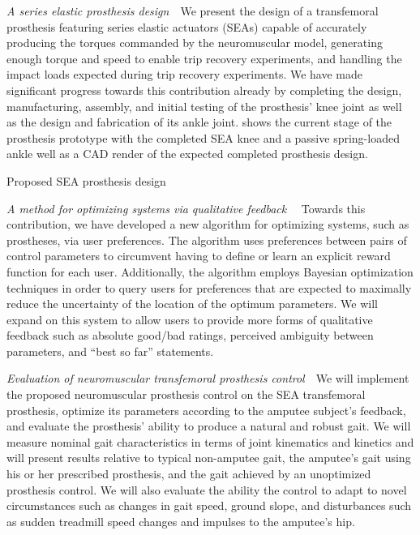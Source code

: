 \begin{contributions}
    \item\label{contrib:pros_design} \emph{A series elastic prosthesis
    design}~~We present the design of a transfemoral prosthesis featuring series
    elastic actuators (SEAs) capable of accurately producing the torques
    commanded by the neuromuscular model, generating enough torque and speed to
    enable trip recovery experiments, and handling the impact loads expected
    during trip recovery experiments. We have made significant progress towards
    this contribution already by completing the design, manufacturing, assembly,
    and initial testing of the prosthesis' knee joint as well as the design and
    fabrication of its ankle joint.   shows the
    current stage of the prosthesis prototype with the completed SEA knee and a
    passive spring-loaded ankle well as a CAD render of the expected completed
    prosthesis design.
    \begin{marginfigure}[-2in]
        \centering
        \caption{Proposed SEA prosthesis design}
        \label{fig:prosthesis_design}
    \end{marginfigure}

    \item\label{contrib:pref_opt} \emph{A method for optimizing systems via
    qualitative feedback}~~ Towards this contribution, we have developed a new
    algorithm for optimizing systems, such as prostheses, via user preferences.
    The algorithm uses preferences between pairs of control parameters to
    circumvent having to define or learn an explicit reward function for each
    user. Additionally, the algorithm employs Bayesian optimization techniques
    in order to query users for preferences that are expected to maximally
    reduce the uncertainty of the location of the optimum parameters. We will
    expand on this system to allow users to provide more forms of qualitative
    feedback such as absolute good/bad ratings, perceived ambiguity between
    parameters, and ``best so far'' statements.

    \item\label{contrib:neuromuc_eval} \emph{Evaluation of neuromuscular
    transfemoral prosthesis control}~~We will implement the proposed
    neuromuscular prosthesis control on the SEA transfemoral prosthesis,
    optimize its parameters according to the amputee subject's feedback, and
    evaluate the prosthesis' ability to produce a natural and robust gait. We
    will measure nominal gait characteristics in terms of joint kinematics and
    kinetics and will present results relative to typical non-amputee gait, the
    amputee's gait using his or her prescribed prosthesis, and the gait achieved
    by an unoptimized prosthesis control. We will also evaluate the ability the
    control to adapt to novel circumstances such as changes in gait speed,
    ground slope, and disturbances such as sudden treadmill speed changes and
    impulses to the amputee's hip.


\end{contributions}
